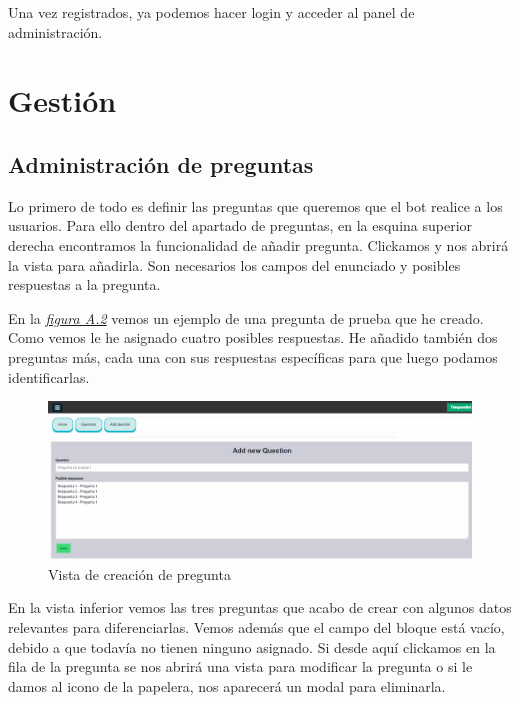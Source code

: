 Una vez registrados, ya podemos hacer login y acceder al panel de administración.\vspace{0.5cm}

\section{Gestión}\vspace{0.5cm}

\subsection{Administración de preguntas}\vspace{0.5cm}

Lo primero de todo es definir las preguntas que queremos que el bot realice a los usuarios. Para ello dentro del apartado de preguntas, en la esquina superior derecha encontramos la funcionalidad de añadir pregunta. Clickamos y nos abrirá la vista para añadirla. Son necesarios los campos del enunciado y posibles respuestas a la pregunta. 

En la \textit{\hyperref[fig:creacion_pregunta]{figura A.2}} vemos un ejemplo de una pregunta de prueba que he creado. Como vemos le he asignado cuatro posibles respuestas. He añadido también dos preguntas más, cada una con sus respuestas específicas para que luego podamos identificarlas.
\vspace{0.5cm}

\begin{figure}[!ht]
    \centering
    \includegraphics[width=1\textwidth]{imagenes/aniadir_pregunta_a.png}
    \caption{ Vista de creación de pregunta }
    \label{fig:creacion_pregunta}
\end{figure}
 

En la vista inferior vemos las tres preguntas que acabo de crear con algunos datos relevantes para diferenciarlas. Vemos además que el campo del bloque está vacío, debido a que todavía no tienen ninguno asignado. Si desde aquí clickamos en la fila de la pregunta se nos abrirá una vista para modificar la pregunta o si le damos al icono de la papelera, nos aparecerá un modal para eliminarla.\vspace{0.5cm}


